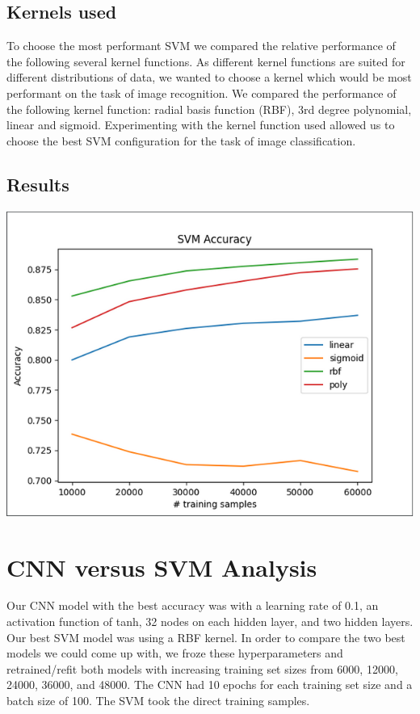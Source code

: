 \documentclass[12pt]{article}
\begin{document}
\subsection{Kernels used}

To choose the most performant SVM we compared the relative performance of the following several kernel functions. As different kernel functions are suited for different distributions of data, we wanted to choose a kernel which would be most performant on the task of image recognition. We compared the performance of the following kernel function: radial basis function (RBF), 3rd degree polynomial, linear and sigmoid. Experimenting with the kernel function used allowed us to choose the best SVM configuration for the task of image classification.

\subsection{Results}

\includegraphics[scale=.75]{svmgraph1.PNG}

\section{CNN versus SVM Analysis}

Our CNN model with the best accuracy was with a learning rate of 0.1, an activation function of tanh, 32 nodes on each hidden layer, and two hidden layers. Our best SVM model was using a RBF kernel. In order to compare the two best models we could come up with, we froze these hyperparameters and retrained/refit both models with increasing training set sizes from 6000, 12000, 24000, 36000, and 48000. The CNN had 10 epochs for each training set size and a batch size of 100. The SVM took the direct training samples.
\end{document}

